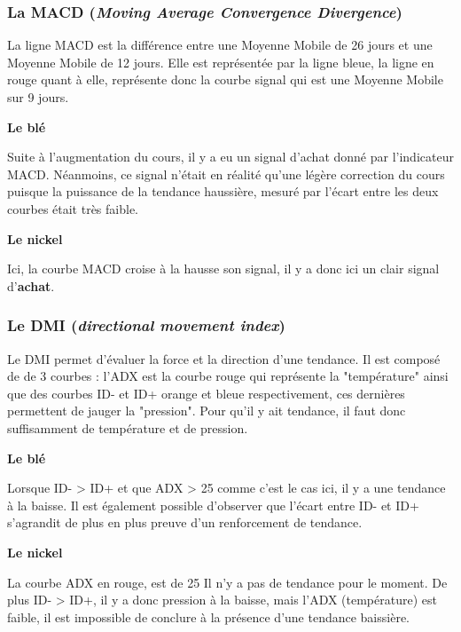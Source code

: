 \subsubsection*{La MACD (\textit{Moving Average Convergence Divergence})}
La ligne MACD est la différence entre une Moyenne Mobile de 26 jours et une Moyenne Mobile de 12 jours. Elle est représentée par la ligne bleue, la ligne en rouge quant à 
elle, représente donc la courbe signal qui est une Moyenne Mobile sur 9 jours.
\begin{multicols}{2}
\centerline{\textbf{Le blé}}
Suite à l'augmentation du cours, il y a eu un signal d'achat donné par l'indicateur MACD. Néanmoins, ce signal n'était en réalité qu'une légère correction du cours puisque la puissance de la tendance haussière, mesuré par l'écart entre les deux courbes était très faible.

\columnbreak
\centerline{\textbf{Le nickel}}
Ici, la courbe MACD croise à la hausse son signal, il y a donc ici un clair signal d'\textcolor{OliveGreen}{\textbf{achat}}.
\end{multicols}
\subsubsection*{Le DMI (\textit{directional movement index})}
Le DMI permet d'évaluer la force et la direction d'une tendance. Il est composé de de 3 courbes : l'ADX est la courbe rouge qui représente la "température" ainsi que des 
courbes ID- et ID+ orange et bleue respectivement, ces dernières permettent de jauger la "pression". Pour qu'il y ait tendance, il faut donc suffisamment de 
température et de pression. 
\begin{multicols}{2}
\centerline{\textbf{Le blé}}
Lorsque ID- > ID+ et que ADX > 25 comme c'est le cas ici, il y a une tendance à la baisse. Il est également possible d'observer que l'écart entre ID- et ID+ 
s'agrandit de plus en plus preuve d'un renforcement de tendance.

\columnbreak
\centerline{\textbf{Le nickel}}
La courbe ADX en rouge, est de 25 Il n'y a pas de tendance pour le moment. De plus ID- > ID+, il y a donc pression à la baisse, mais l'ADX (température) est faible, il est impossible de conclure à la présence d'une tendance baissière.
\end{multicols}
